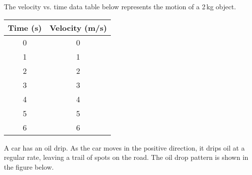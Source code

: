 \documentclass[../main-physics-problems.tex]{subfiles}
\begin{document}
\begin{questions}
\question
The velocity vs. time data table below represents the motion of a 2\,kg object.

\begin{center}
    \begin{tabular}{c|c}
        \textbf{Time} (s) & \textbf{Velocity} (m/s) \\ \hline
        0 & 0 \\ 
        1 & 1 \\
        2 & 2 \\
        3 & 3 \\
        4 & 4 \\
        5 & 5 \\
        6 & 6 \\
    \end{tabular}
\end{center}


\question
A car has an oil drip. As the car moves in the positive direction, it drips oil at a regular rate, leaving a trail of spots on the road. The oil drop pattern is shown in the figure below.

\begin{center}
\end{center}


\end{questions}
\end{document}

